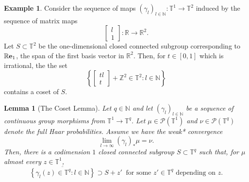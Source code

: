\documentclass[reqno,11pt, twoside]{amsart}
\theoremstyle{plain}
\newtheorem{lem}[thm]{Lemma}
\theoremstyle{definition}
\newtheorem{exmp}[thm]{Example}
\theoremstyle{definition}
\theoremstyle{remark}
\numberwithin{equation}{section}
\newcommand\ca[1]{\mathcal{#1}}
\newcommand{\R}{{\mathbb{R}}}
\newcommand{\T}{{\mathbb{T}}}
\newcommand{\Z}{{\mathbb{Z}}}
\newcommand{\N}{{\mathbb{N}}}
\newcommand{\ve}{{\bf e}}
\begin{document}
\begin{exmp}
    Consider the sequence of maps $(\gamma_l)_{l \in \N} : \T^1 \to \T^2$ induced by the sequence of matrix maps
    \begin{equation*}
        \left[ {\begin{array}{c} l  \\ 
    1  \end{array}}\right] : \R \to \R^2.
    \end{equation*}
    Let $S \subset \T^2$ be the one-dimensional closed connected subgroup corresponding to $\R\ve_1$, the span of the first basis vector in $\R^2$.
    Then, for $t \in [0,1]$ which is irrational, the the set
    \begin{equation*}
        \left\lbrace \left[ {\begin{array}{c} tl  \\ 
    t  \end{array}}\right] + \Z^2 \in \T^2 : l \in \N\right\rbrace
    \end{equation*}
    contains a coset of $S$.
\end{exmp}
\begin{lem}[The Coset Lemma]\label{lem: coset}
    Let $q \in \N$ and let $(\gamma_l)_{l \in \N}$ be a sequence of continuous group morphisms from $\T^1 \to \T^q$. Let $\mu \in \ca{P}(\T^1)$ and $\nu \in \ca{P}(\T^q)$ denote the full Haar probabilities. Assume we have the weak* convergence
    \begin{equation}\label{eq: equidistribution}
        \lim_{l \to \infty} (\gamma_l)_* \mu = \nu.
    \end{equation}
    Then, there is a codimension $1$ closed connected subgroup $S\subset \T^q$ such that, for $\mu$ almost every $z \in \T^1$, 
    \begin{equation*}
        \overline{\left\lbrace \gamma_l(z) \in \T^q : l \in \N\right\rbrace} \supset S + z'\ \text{ for some } z' \in \T^q \text{ depending on $z$}.
    \end{equation*}
\end{lem}
\end{document}
